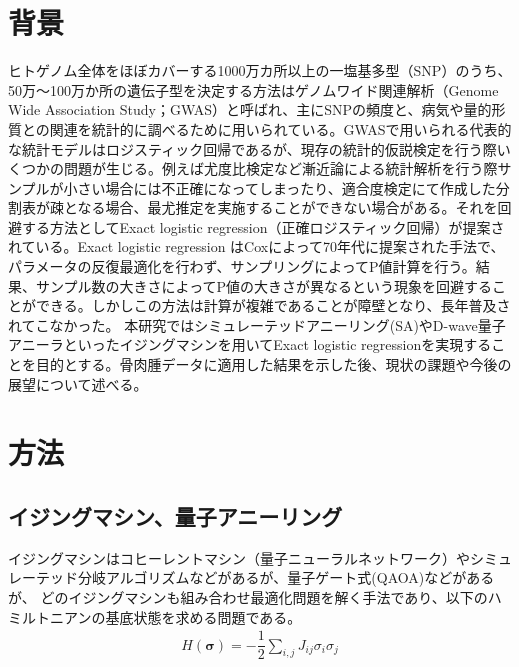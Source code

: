 \documentclass[9pt, twocolumn]{jarticle}
\begin{document}
	
	\section{背景}
	ヒトゲノム全体をほぼカバーする1000万カ所以上の一塩基多型（SNP）のうち、50万～100万か所の遺伝子型を決定する方法はゲノムワイド関連解析（Genome Wide Association Study；GWAS）と呼ばれ、主にSNPの頻度と、病気や量的形質との関連を統計的に調べるために用いられている。GWASで用いられる代表的な統計モデルはロジスティック回帰であるが、現存の統計的仮説検定を行う際いくつかの問題が生じる。例えば尤度比検定など漸近論による統計解析を行う際サンプルが小さい場合には不正確になってしまったり、適合度検定にて作成した分割表が疎となる場合、最尤推定を実施することができない場合がある。それを回避する方法としてExact logistic regression（正確ロジスティック回帰）が提案されている。Exact logistic regression はCoxによって70年代に提案された手法で\cite{cox70}、パラメータの反復最適化を行わず、サンプリングによってP値計算を行う\cite{elreg}。結果、サンプル数の大きさによってP値の大きさが異なるという現象を回避することができる。しかしこの方法は計算が複雑であることが障壁となり、長年普及されてこなかった。
	本研究ではシミュレーテッドアニーリング(SA)やD-wave量子アニーラといったイジングマシンを用いてExact logistic regressionを実現することを目的とする。骨肉腫データに適用した結果を示した後、現状の課題や今後の展望について述べる。
	
	\section{方法}
	\subsection{イジングマシン、量子アニーリング}
	イジングマシンはコヒーレントマシン（量子ニューラルネットワーク）やシミュレーテッド分岐アルゴリズムなどがあるが、量子ゲート式(QAOA)などがあるが、
	どのイジングマシンも組み合わせ最適化問題を解く手法であり、以下のハミルトニアンの基底状態を求める問題である。
	\begin{eqnarray}
		H(\bm{\sigma}) = -\dfrac{1}{2}\sum_{i, j}J_{ij}\sigma_i \sigma_j
	\end{eqnarray}
	
\end{document}
